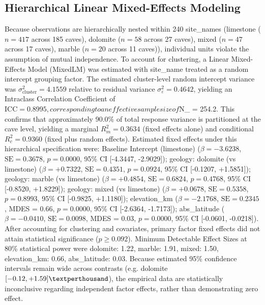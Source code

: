 \documentclass[sn-basic,Numbered]{sn-jnl}%
\begin{document}
\subsection{Hierarchical Linear Mixed-Effects Modeling}
Because observations are hierarchically nested within 240 site\_names (limestone ($n = 417$ across 185 caves), dolomite ($n = 58$ across 27 caves), mixed ($n = 47$ across 17 caves), marble ($n = 20$ across 11 caves)), individual units violate the assumption of mutual independence. To account for clustering, a Linear Mixed-Effects Model (MixedLM) was estimated with site\_name treated as a random intercept grouping factor. The estimated cluster-level random intercept variance was $\sigma^2_{\text{cluster}} = 4.1559$ relative to residual variance $\sigma^2_\varepsilon = 0.4642$, yielding an Intraclass Correlation Coefficient of $\text{ICC} = 0.8995, corresponding to an effective sample size of $N\_{} = 254.2. This confirms that approximately 90.0\% of total response variance is partitioned at the cave level, yielding a marginal $R^2_m = 0.3634$ (fixed effects alone) and conditional $R^2_c = 0.9360$ (fixed plus random effects). Estimated fixed effects under this hierarchical specification were: Baseline Intercept (limestone) ($\beta = -3.6238$, $\text{SE} = 0.3678$, $p = 0.0000$, 95\% CI [-4.3447, -2.9029]); geology: dolomite (vs limestone) ($\beta = +0.7322$, $\text{SE} = 0.4351$, $p = 0.0924$, 95\% CI [-0.1207, +1.5851]); geology: marble (vs limestone) ($\beta = +0.4854$, $\text{SE} = 0.6824$, $p = 0.4768$, 95\% CI [-0.8520, +1.8229]); geology: mixed (vs limestone) ($\beta = +0.0678$, $\text{SE} = 0.5358$, $p = 0.8993$, 95\% CI [-0.9825, +1.1180]); elevation\_km ($\beta = -2.1768$, $\text{SE} = 0.2345$, MDES = 0.66\text{\textperthousand}, $p = 0.0000$, 95\% CI [-2.6364, -1.7173]); abs\_latitude ($\beta = -0.0410$, $\text{SE} = 0.0098$, MDES = 0.03\text{\textperthousand}, $p = 0.0000$, 95\% CI [-0.0601, -0.0218]). After accounting for clustering and covariates, primary factor fixed effects did not attain statistical significance ($p \ge 0.092$). Minimum Detectable Effect Sizes at 80\% statistical power were dolomite: 1.22\text{\textperthousand}, marble: 1.91\textperthousand, mixed: 1.50\textperthousand, elevation\_km: 0.66\textperthousand, abs\_latitude: 0.03\textperthousand. Because estimated 95\% confidence intervals remain wide across contrasts (e.g. dolomite $[-0.12, +1.59]\textperthousand$), the empirical data are statistically inconclusive regarding independent factor effects, rather than demonstrating zero effect.
\end{document}
